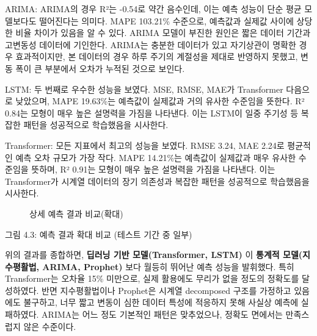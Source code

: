 \documentclass[12pt,ko,a4,]{report}
\begin{document}
ARIMA: ARIMA의 경우 R²는 -0.54로 약간 음수인데, 이는 예측 성능이 단순
평균 모델보다도 떨어진다는 의미다. MAPE 103.21\% 수준으로, 예측값과
실제값 사이에 상당한 비율 차이가 있음을 알 수 있다. ARIMA 모델이 부진한
원인은 짧은 데이터 기간과 고변동성 데이터에 기인한다. ARIMA는 충분한
데이터가 있고 자기상관이 명확한 경우 효과적이지만, 본 데이터의 경우 하루
주기의 계절성을 제대로 반영하지 못했고, 변동 폭이 큰 부분에서 오차가
누적된 것으로 보인다.

LSTM: 두 번째로 우수한 성능을 보였다. MSE, RMSE, MAE가 Transformer
다음으로 낮았으며, MAPE 19.63\%는 예측값이 실제값과 거의 유사한 수준임을
뜻한다. R² 0.84는 모형이 매우 높은 설명력을 가짐을 나타낸다. 이는 LSTM이
일중 주기성 등 복잡한 패턴을 성공적으로 학습했음을 시사한다.

Transformer: 모든 지표에서 최고의 성능을 보였다. RMSE 3.24, MAE 2.24로
평균적인 예측 오차 규모가 가장 작다. MAPE 14.21\%는 예측값이 실제값과
매우 유사한 수준임을 뜻하며, R² 0.91는 모형이 매우 높은 설명력을 가짐을
나타낸다. 이는 Transformer가 시계열 데이터의 장기 의존성과 복잡한 패턴을
성공적으로 학습했음을 시사한다.

\begin{figure}
\centering
{}
\caption{상세 예측 결과 비교(확대)}
\end{figure}

그림 4.3: 예측 결과 확대 비교 (테스트 기간 중 일부)

위의 결과를 종합하면, \textbf{딥러닝 기반 모델(Transformer, LSTM)} 이
\textbf{통계적 모델(지수평활법, ARIMA, Prophet)} 보다 월등히 뛰어난 예측
성능을 발휘했다. 특히 Transformer는 오차율 15\% 미만으로, 실제 활용에도
무리가 없을 정도의 정확도를 달성하였다. 반면 지수평활법이나 Prophet은
시계열 decomposed 구조를 가정하고 있음에도 불구하고, 너무 짧고 변동이
심한 데이터 특성에 적응하지 못해 사실상 예측에 실패하였다. ARIMA는 어느
정도 기본적인 패턴은 맞추었으나, 정확도 면에서는 만족스럽지 않은
수준이다.
\end{document}

